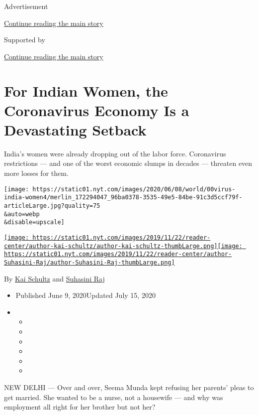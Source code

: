 Advertisement

\protect\hyperlink{after-top}{Continue reading the main story}

Supported by

\protect\hyperlink{after-sponsor}{Continue reading the main story}

\hypertarget{for-indian-women-the-coronavirus-economy-is-a-devastating-setback}{%
\section{For Indian Women, the Coronavirus Economy Is a Devastating
Setback}\label{for-indian-women-the-coronavirus-economy-is-a-devastating-setback}}

India's women were already dropping out of the labor force. Coronavirus
restrictions --- and one of the worst economic slumps in decades ---
threaten even more losses for them.

\texttt{[image: https://static01.nyt.com/images/2020/06/08/world/00virus-india-women4/merlin\_172294047\_96ba0378-3535-49e5-84be-91c3d5ccf79f-articleLarge.jpg?quality=75\\\&auto=webp\\\&disable=upscale]}

\href{https://www.nytimes.com/by/kai-schultz}{\texttt{[image: https://static01.nyt.com/images/2019/11/22/reader-center/author-kai-schultz/author-kai-schultz-thumbLarge.png]}}\href{https://www.nytimes.com/by/suhasini-raj}{\texttt{[image: https://static01.nyt.com/images/2019/11/22/reader-center/author-Suhasini-Raj/author-Suhasini-Raj-thumbLarge.png]}}

By \href{https://www.nytimes.com/by/kai-schultz}{Kai Schultz} and
\href{https://www.nytimes.com/by/suhasini-raj}{Suhasini Raj}

\begin{itemize}
\item
  Published June 9, 2020Updated July 15, 2020
\item
  \begin{itemize}
  \item
  \item
  \item
  \item
  \item
  \item
  \end{itemize}
\end{itemize}

NEW DELHI --- Over and over, Seema Munda kept refusing her parents'
pleas to get married. She wanted to be a nurse, not a housewife --- and
why was employment all right for her brother but not her?

